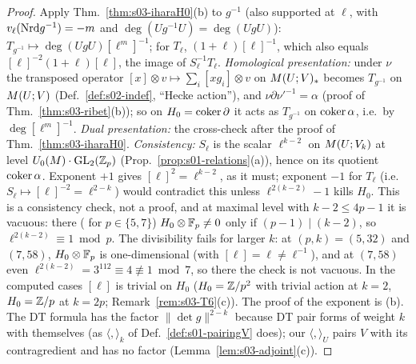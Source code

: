 \begin{proof}
Apply Thm.~\ref{thm:s03-iharaH0}(b) to $g^{-1}$ (also supported at $\ell$, with $v_\ell(\mathrm{Nrd} g^{-1})=-m$ and $\deg(Ug^{-1}U)=\deg(UgU)$): $T_{g^{-1}}\mapsto\deg(UgU)[\ell^m]^{-1}$;
for $T_\ell$, $(1+\ell)[\ell]^{-1}$, which also equals $[\ell]^{-2}(1+\ell)[\ell]$, the image of $S_\ell^{-1}T_\ell$. \emph{Homological presentation:} under $\nu$ the
transposed operator $[x]\otimes v\mapsto\sum_i[xg_i]\otimes v$ on $M(U;V)_*$ becomes $T_{g^{-1}}$ on $M(U;V)$ (Def.~\ref{def:s02-indef}, ``Hecke
action''), and $\nu\partial\nu'^{-1}=\alpha$ (proof of Thm.~\ref{thm:s03-ribet}(b)); so on $H_0=\operatorname{coker}\partial$ it acts as $T_{g^{-1}}$ on $\operatorname{coker}\alpha$, i.e.\ by
$\deg[\ell^m]^{-1}$. \emph{Dual presentation:} the cross-check after the proof of Thm.~\ref{thm:s03-iharaH0}. \emph{Consistency:} $S_\ell$ is the scalar
$\ell^{k-2}$ on $M(U;V_k)$ at level $U_0(M)\cdot\mathrm{GL}_2(\mathbb{Z}_p)$ (Prop.~\ref{prop:s01-relations}(a)), hence on its quotient $\operatorname{coker}\alpha$. Exponent
$+1$ gives $[\ell]^2=\ell^{k-2}$, as it must; exponent $-1$ for $T_\ell$ (i.e.\ $S_\ell\mapsto[\ell]^{-2}=\ell^{2-k}$) would contradict this unless
$\ell^{2(k-2)}-1$ kills $H_0$. This is a consistency check, not a proof, and at maximal level with $k-2\le4p-1$ it is vacuous: there (\stcomp{} for $p\in\{5,7\}$) $H_0\otimes\mathbb{F}_p\ne0$ only if
$(p-1)\mid(k-2)$, so $\ell^{2(k-2)}\equiv1\bmod p$. The divisibility fails for larger $k$: at $(p,k)=(5,32)$ and $(7,58)$, $H_0\otimes\mathbb{F}_p$ is one-dimensional
(with $[\ell]=\ell\ne\ell^{-1}$), and at $(7,58)$ even $\ell^{2(k-2)}=3^{112}\equiv4\not\equiv1\bmod7$, so there the check is not vacuous. In the computed cases $[\ell]$ is trivial on $H_0$ ($H_0=\mathbb{Z}/p^2$ with trivial action at $k=2$, $H_0=\mathbb{Z}/p$ at $k=2p$; Remark~\ref{rem:s03-T6}(c)). The proof of the exponent is
(b). The DT formula has the factor $\|\det g\|^{2-k}$ because DT pair forms of weight $k$ with themselves (as $\langle,\rangle_k$ of
Def.~\ref{def:s01-pairingV} does); our $\langle,\rangle_U$ pairs $V$ with its contragredient and has no factor (Lemma~\ref{lem:s03-adjoint}(c)).
\end{proof}


